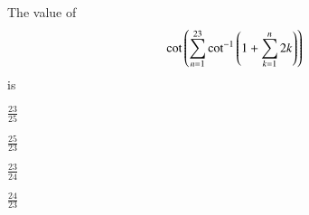 \item The value of 
\begin{align*}
\cot \left(\sum_{n=1}^{23} \cot ^{-1}\left(1+\sum_{k=1}^{n} 2k\right)\right)
\end{align*}
is
\hfill {}
\begin{enumerate}
\begin{multicols}{2}
\item $\frac{23}{25}$ 
\columnbreak
\item $\frac{25}{23}$ 
\end{multicols}
\begin{multicols}{2}
\item $\frac{23}{24}$ 
\columnbreak
\item $\frac{24}{23}$
\end{multicols}
\end{enumerate}
